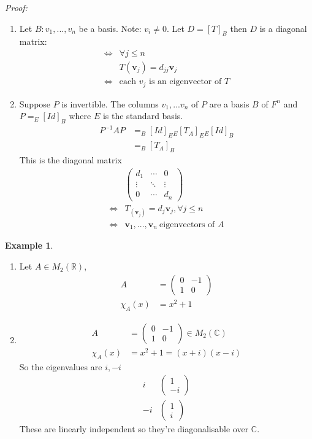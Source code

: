 \documentclass{report}
\theoremstyle{remark}
\theoremstyle{definition}
\theoremstyle{definition}
\newtheorem{example}[theorem]{Example}
\theoremstyle{theorem}
\renewcommand{\v}[1]{\mathbf{#1}}
\providecommand{\vectii}[2]{\begin{pmatrix}#1\\#2\end{pmatrix}}
\begin{document}
\emph{Proof:} \begin{enumerate}[label=(\arabic*)]
    \item Let $B:v_1,...,v_n$ be a basis. Note: $v_i\neq0$. Let $D=[T]_B$ then $D$ is a diagonal matrix:
    \begin{align*}
        \iff& \forall j \leq n\\
        & T(\v{v}_j)=d_{jj}\v{v}_j\\
        \iff& \text{each $v_j$ is an eigenvector of $T$}
    \end{align*}
    \item Suppose $P$ is invertible. The columns $v_1,...v_n$ of $P$ are a basis $B$ of $F^n$ and $P=_E[Id]_B$ where $E$ is the standard basis.
    \begin{align*}
        P^{-1}AP&= _B{}[Id]_E{} _E[T_A]_E{} _E[Id]_B\\
        &= _B{}[T_A]_B
    \end{align*}
    This is the diagonal matrix
    \begin{align*}
        &\begin{pmatrix}
        d_1&\cdots&0\\
        \vdots&\ddots&\vdots\\
        0&\cdots&d_n
        \end{pmatrix}\\
        \iff&T_(\v{v}_j)=d_j\v{v}_j, \forall j\leq n\\
        \iff&\v{v}_1,...,\v{v}_n \> \text{eigenvectors of $A$}
     \end{align*}
\end{enumerate}
\begin{example}
\begin{enumerate}[label=(\arabic*)]
    \item Let $A \in M_2(\mathbb{R})$, 
    \begin{align*}A&=\begin{pmatrix}
        0&-1\\
        1&0
        \end{pmatrix}\\
        \chi_A(x)&=x^2+1
    \end{align*}
    \item
    \begin{align*}
        A &= \begin{pmatrix}
        0&-1\\
        1&0
        \end{pmatrix} \in M_2(\mathbb{C})\\
        \chi_A(x)&=x^2+1=(x+i)(x-i)
    \end{align*}
    So the eigenvalues are $i, -i$
    \[
    \begin{array}{c|c}
        i&\vectii{1}{-i}\\
        -i&\vectii{1}{i}
    \end{array}\]
    These are linearly independent so they're diagonalisable over $\mathbb{C}$.
\end{enumerate}
\end{example}
\end{document}
